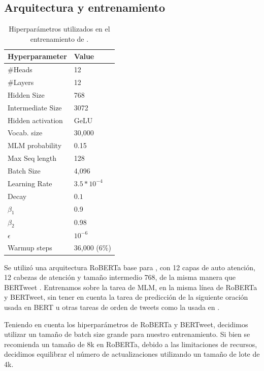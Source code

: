 \subsection{Arquitectura y entrenamiento}

\begin{table}[t]
    \centering
    \begin{tabular}{l|l}
        \hline
        Hyperparameter  & Value \\
        \hline
        \#Heads           & 12             \\
        \#Layers          & 12             \\
        Hidden Size       & 768            \\
        Intermediate Size & 3072           \\
        Hidden activation & GeLU           \\
        Vocab. size       & 30,000         \\
        \hline
        MLM probability   & 0.15           \\
        Max Seq length    & 128            \\
        Batch Size        & 4,096          \\
        Learning Rate     & $3.5 * 10^{-4}$\\
        Decay             & $0.1$          \\
        $\beta_1$         & 0.9            \\
        $\beta_2$         & 0.98           \\
        $\epsilon$        & $10^{-6}$      \\
        Warmup steps      & 36,000 (6\%)   \\
        \hline
    \end{tabular}
    \caption{Hiperparámetros utilizados en el entrenamiento de \robertuito{}.}
    \label{tab:robertuito_architecture}
\end{table}

Se utilizó una arquitectura RoBERTa base para \robertuito{}, con 12 capas de auto atención, 12 cabezas de atención y tamaño intermedio 768, de la misma manera que BERTweet \cite{bertweet}. Entrenamos sobre la tarea de MLM, en la misma línea de RoBERTa y BERTweet, sin tener en cuenta la tarea de predicción de la siguiente oración usada en BERT u otras tareas de orden de tweets como la usada en \citet{gonzalez2021twilbert}.

Teniendo en cuenta los hiperparámetros de RoBERTa y BERTweet, decidimos utilizar un tamaño de batch size grande para nuestro entrenamiento. Si bien se recomienda un tamaño de 8k en RoBERTa, debido a las limitaciones de recursos, decidimos equilibrar el número de actualizaciones utilizando un tamaño de lote de 4k.

